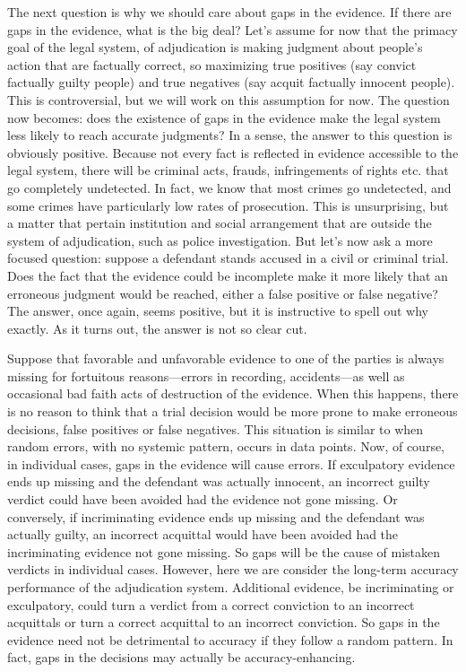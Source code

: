\documentclass[
  10pt,
  dvipsnames,enabledeprecatedfontcommands]{scrartcl}
\begin{document}
The next question is why we should care about gaps in the evidence. If
there are gaps in the evidence, what is the big deal? Let's assume for
now that the primacy goal of the legal system, of adjudication is making
judgment about people's action that are factually correct, so maximizing
true positives (say convict factually guilty people) and true negatives
(say acquit factually innocent people). This is controversial, but we
will work on this assumption for now. The question now becomes: does the
existence of gaps in the evidence make the legal system less likely to
reach accurate judgments? In a sense, the answer to this question is
obviously positive. Because not every fact is reflected in evidence
accessible to the legal system, there will be criminal acts, frauds,
infringements of rights etc. that go completely undetected. In fact, we
know that most crimes go undetected, and some crimes have particularly
low rates of prosecution. This is unsurprising, but a matter that
pertain institution and social arrangement that are outside the system
of adjudication, such as police investigation. But let's now ask a more
focused question: suppose a defendant stands accused in a civil or
criminal trial. Does the fact that the evidence could be incomplete make
it more likely that an erroneous judgment would be reached, either a
false positive or false negative? The answer, once again, seems
positive, but it is instructive to spell out why exactly. As it turns
out, the answer is not so clear cut.

Suppose that favorable and unfavorable evidence to one of the parties is
always missing for fortuitous reasons---errors in recording,
accidents---as well as occasional bad faith acts of destruction of the
evidence. When this happens, there is no reason to think that a trial
decision would be more prone to make erroneous decisions, false
positives or false negatives. This situation is similar to when random
errors, with no systemic pattern, occurs in data points. Now, of course,
in individual cases, gaps in the evidence will cause errors. If
exculpatory evidence ends up missing and the defendant was actually
innocent, an incorrect guilty verdict could have been avoided had the
evidence not gone missing. Or conversely, if incriminating evidence ends
up missing and the defendant was actually guilty, an incorrect acquittal
would have been avoided had the incriminating evidence not gone missing.
So gaps will be the cause of mistaken verdicts in individual cases.
However, here we are consider the long-term accuracy performance of the
adjudication system. Additional evidence, be incriminating or
exculpatory, could turn a verdict from a correct conviction to an
incorrect acquittals or turn a correct acquittal to an incorrect
conviction. So gaps in the evidence need not be detrimental to accuracy
if they follow a random pattern. In fact, gaps in the decisions may
actually be accuracy-enhancing.
\end{document}
